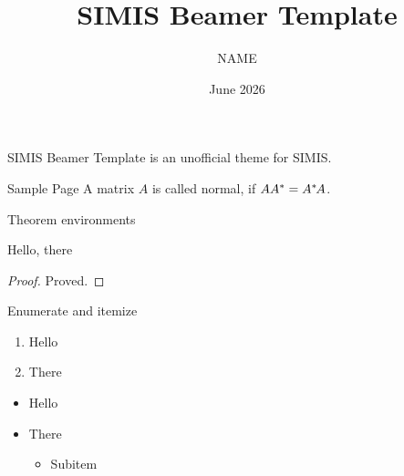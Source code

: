 \documentclass{beamer}
\title{SIMIS Beamer Template}
\author{NAME}
\institute{SIMIS \& Fudan University}
\date{June 2026}
\begin{document}
  
  \begin{frame}
    \maketitle
  \end{frame}

  \begin{frame}
    \alert{SIMIS Beamer Template} is an unofficial theme for SIMIS.
  \end{frame}

  \begin{frame}{Sample Page}
    A matrix $A$ is called normal, if $AA^*=A^*\mskip-2muA$.
  \end{frame}

  \begin{frame}{Theorem environments}
    \begin{theorem}
      Hello, there
    \end{theorem}
    \begin{proof}
      Proved.
    \end{proof}
  \end{frame}

  \begin{frame}{Enumerate and itemize}
    \begin{enumerate}
      \item Hello
      \item There
    \end{enumerate}
    \begin{itemize}
      \item Hello
      \item There
      \begin{itemize}
        \item Subitem
      \end{itemize}
    \end{itemize}
  \end{frame}

  \begin{frame}
    \itshape\lipsum[3]
  \end{frame}
\end{document}
